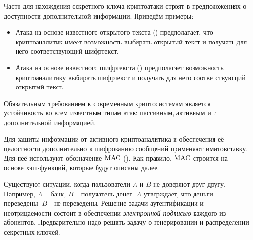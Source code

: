 Часто для нахождения секретного ключа криптоатаки строят в предположениях о доступности дополнительной информации. Приведём примеры:
\begin{itemize}
    \item Атака на основе известного открытого текста () предполагает, что криптоаналитик имеет возможность выбирать открытый текст и получать для него соответствующий шифртекст.
    \item Атака на основе известного шифртекста () предполагает возможность криптоаналитику выбирать шифртекст и получать для него соответствующий открытый текст.
\end{itemize}

Обязательным требованием к современным криптосистемам является устойчивость ко всем известным типам атак: пассивным, активным и с дополнительной информацией.


%

Для защиты информации от активного криптоаналитика и обеспечения её целостности дополнительно к шифрованию сообщений применяют имитовставку. Для неё используют обозначение $\textrm{MAC}$ (). Как правило, $\textrm{MAC}$ строится на основе хэш-функций, которые будут описаны далее.

Существуют ситуации, когда пользователи $A$ и $B$ не доверяют друг другу. Например, $A$ -- банк, $B$ -- получатель денег. $A$ утверждает, что деньги переведены, $B$ - не переведены. Решение задачи аутентификации и неотрицаемости состоит в обеспечении \emph{электронной подписью} каждого из абонентов. Предварительно надо решить задачу о генерировании и распределении секретных ключей.

